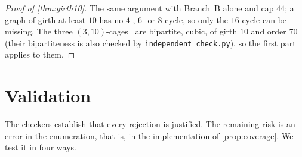 \documentclass[11pt]{amsart}
\theoremstyle{definition}
\theoremstyle{remark}
\newcommand{\code}[1]{\texttt{#1}}
\begin{document}
\begin{proof}[Proof of \cref{thm:girth10}]
The same argument with Branch~B alone and cap $44$; a graph of girth at least
$10$ has no $4$-, $6$- or $8$-cycle, so only the $16$-cycle can be missing. The
three $(3,10)$-cages~\cite{OKeefeWong1980,Wong1983} are bipartite, cubic, of
girth $10$ and order $70$ (their bipartiteness is also checked by
\code{independent\_check.py}), so the first part applies to them.
\end{proof}

\section{Validation}\label{sec:validation}

The checkers establish that every rejection is justified. The remaining risk is
an error in the enumeration, that is, in the implementation of
\cref{prop:coverage}. We test it in four ways.
\end{document}
